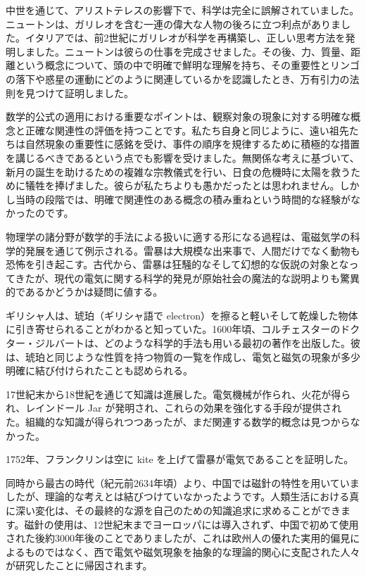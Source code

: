 \documentclass[a4paper,11pt,openany]{ltjsbook}
\begin{document}
中世を通じて、アリストテレスの影響下で、科学は完全に誤解されていました。ニュートンは、ガリレオを含む一連の偉大な人物の後ろに立つ利点がありました。イタリアでは、前2世紀にガリレオが科学を再構築し、正しい思考方法を発明しました。ニュートンは彼らの仕事を完成させました。その後、力、質量、距離という概念について、頭の中で明確で鮮明な理解を持ち、その重要性とリンゴの落下や惑星の運動にどのように関連しているかを認識したとき、万有引力の法則を見つけて証明しました。

数学的公式の適用における重要なポイントは、観察対象の現象に対する明確な概念と正確な関連性の評価を持つことです。私たち自身と同じように、遠い祖先たちは自然現象の重要性に感銘を受け、事件の順序を規律するために積極的な措置を講じるべきであるという点でも影響を受けました。無関係な考えに基づいて、新月の誕生を助けるための複雑な宗教儀式を行い、日食の危機時に太陽を救うために犠牲を捧げました。彼らが私たちよりも愚かだったとは思われません。しかし当時の段階では、明確で関連性のある概念の積み重ねという時間的な経験がなかったのです。

物理学の諸分野が数学的手法による扱いに適する形になる過程は、電磁気学の科学的発展を通じて例示される。雷暴は大規模な出来事で、人間だけでなく動物も恐怖を引き起こす。古代から、雷暴は狂騒的なそして幻想的な仮説の対象となってきたが、現代の電気に関する科学的発見が原始社会の魔法的な説明よりも驚異的であるかどうかは疑問に値する。

ギリシャ人は、琥珀（ギリシャ語で electron）を擦ると軽いそして乾燥した物体に引き寄せられることがわかると知っていた。1600年頃、コルチェスターのドクター・ジルバートは、どのような科学的手法も用いる最初の著作を出版した。彼は、琥珀と同じような性質を持つ物質の一覧を作成し、電気と磁気の現象が多少明確に結び付けられたことも認められる。

17世紀末から18世紀を通じて知識は進展した。電気機械が作られ、火花が得られ、レインドール Jar が発明され、これらの効果を強化する手段が提供された。組織的な知識が得られつつあったが、まだ関連する数学的概念は見つからなかった。

1752年、フランクリンは空に kite を上げて雷暴が電気であることを証明した。

同時から最古の時代（紀元前2634年頃）より、中国では磁針の特性を用いていましたが、理論的な考えとは結びつけていなかったようです。人類生活における真に深い変化は、その最終的な源を自己のための知識追求に求めることができます。磁針の使用は、12世紀末までヨーロッパには導入されず、中国で初めて使用された後約3000年後のことでありましたが、これは欧州人の優れた実用的偏見によるものではなく、西で電気や磁気現象を抽象的な理論的関心に支配された人々が研究したことに帰因されます。
\end{document}
